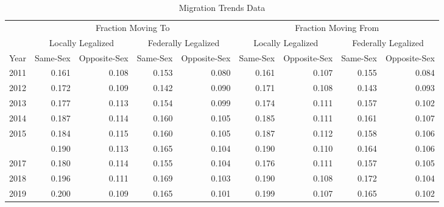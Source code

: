 \begin{table}

\caption{Migration Trends Data}
\centering
\begin{tabular}[t]{rrrrrrrrr}
\toprule
\multicolumn{1}{c}{ } & \multicolumn{4}{c}{Fraction Moving To} & \multicolumn{4}{c}{Fraction Moving From} \\
\cmidrule(l{3pt}r{3pt}){2-5} \cmidrule(l{3pt}r{3pt}){6-9}
\multicolumn{1}{c}{ } & \multicolumn{2}{c}{Locally Legalized} & \multicolumn{2}{c}{Federally Legalized} & \multicolumn{2}{c}{Locally Legalized} & \multicolumn{2}{c}{Federally Legalized} \\
\cmidrule(l{3pt}r{3pt}){2-3} \cmidrule(l{3pt}r{3pt}){4-5} \cmidrule(l{3pt}r{3pt}){6-7} \cmidrule(l{3pt}r{3pt}){8-9}
Year & Same-Sex & Opposite-Sex & Same-Sex & Opposite-Sex & Same-Sex & Opposite-Sex & Same-Sex & Opposite-Sex\\
\midrule
2011 & 0.161 & 0.108 & 0.153 & 0.080 & 0.161 & 0.107 & 0.155 & 0.084\\
2012 & 0.172 & 0.109 & 0.142 & 0.090 & 0.171 & 0.108 & 0.143 & 0.093\\
2013 & 0.177 & 0.113 & 0.154 & 0.099 & 0.174 & 0.111 & 0.157 & 0.102\\
2014 & 0.187 & 0.114 & 0.160 & 0.105 & 0.185 & 0.111 & 0.161 & 0.107\\
2015 & 0.184 & 0.115 & 0.160 & 0.105 & 0.187 & 0.112 & 0.158 & 0.106\\
\addlinespace
2016 & 0.190 & 0.113 & 0.165 & 0.104 & 0.190 & 0.110 & 0.164 & 0.106\\
2017 & 0.180 & 0.114 & 0.155 & 0.104 & 0.176 & 0.111 & 0.157 & 0.105\\
2018 & 0.196 & 0.111 & 0.169 & 0.103 & 0.190 & 0.108 & 0.172 & 0.104\\
2019 & 0.200 & 0.109 & 0.165 & 0.101 & 0.199 & 0.107 & 0.165 & 0.102\\
\bottomrule
\end{tabular}
\end{table}
